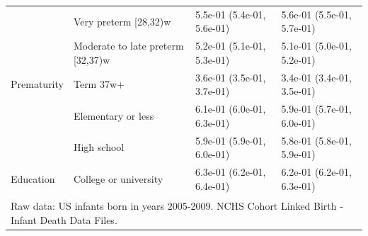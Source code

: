 \documentclass[10pt, twoside, parskip=half]{article}
\begin{document}
\begin{table}[t]
\begin{tabular}{llll}
 & Very preterm [28,32)w & 5.5e-01 (5.4e-01, 5.6e-01) & 5.6e-01 (5.5e-01, 5.7e-01)\\

 & Moderate to late preterm [32,37)w & 5.2e-01 (5.1e-01, 5.3e-01) & 5.1e-01 (5.0e-01, 5.2e-01)\\

\multirow{-4}{*}{\raggedright\arraybackslash \hspace{1em}Prematurity} & Term 37w+ & 3.6e-01 (3.5e-01, 3.7e-01) & 3.4e-01 (3.4e-01, 3.5e-01)\\
\cmidrule{1-4}
 & Elementary or less & 6.1e-01 (6.0e-01, 6.3e-01) & 5.9e-01 (5.7e-01, 6.0e-01)\\

 & High school & 5.9e-01 (5.9e-01, 6.0e-01) & 5.8e-01 (5.8e-01, 5.9e-01)\\

\multirow{-3}{*}{\raggedright\arraybackslash \hspace{1em}Education} & College or university & 6.3e-01 (6.2e-01, 6.4e-01) & 6.2e-01 (6.2e-01, 6.3e-01)\\
\bottomrule
\multicolumn{4}{l}{\textsuperscript{} Raw data: US infants born in years 2005-2009. NCHS Cohort Linked Birth - Infant Death Data Files.}\\
\end{tabular}
\end{table}

\clearpage

\newpage


\end{document}
